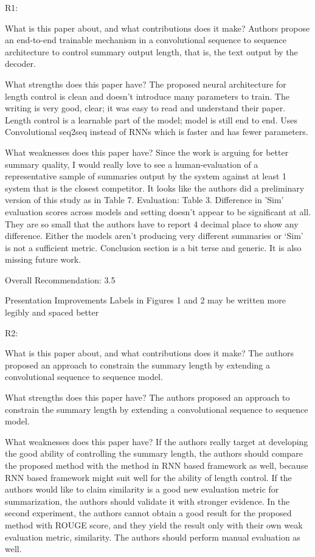 R1:

What is this paper about, and what contributions does it make?
   Authors propose an end-to-end trainable mechanism in a convolutional sequence to sequence architecture to control summary output length, that is, the text output by the decoder.

What strengths does this paper have?
   The proposed neural architecture for length control is clean and doesn’t introduce many parameters to train. The writing is very good, clear; it was easy to read and understand their paper. Length control is a learnable part of the model; model is still end to end. Uses Convolutional seq2seq instead of RNNs which is faster and has fewer parameters.

What weaknesses does this paper have?
   Since the work is arguing for better summary quality, I would really love to see a human-evaluation of a representative sample of summaries output by the system against at least 1 system that is the closest competitor. It looks like the authors did a preliminary version of this study as in Table 7.
   Evaluation: Table 3. Difference in ’Sim’ evaluation scores across models and setting doesn’t appear to be significant at all. They are so small that the authors have to report 4 decimal place to show any difference. Either the models aren’t producing very different summaries or ‘Sim’ is not a sufficient metric.
   Conclusion section is a bit terse and generic. It is also missing future work.

Overall Recommendation:	3.5

Presentation Improvements
  Labels in Figures 1 and 2 may be written more legibly and spaced better

R2:

What is this paper about, and what contributions does it make?
  The authors proposed an approach to constrain the summary length by extending a convolutional sequence to sequence model.

What strengths does this paper have?
  The authors proposed an approach to constrain the summary length by extending a convolutional sequence to sequence model.

What weaknesses does this paper have?
   If the authors really target at developing the good ability of controlling the summary length, the authors should compare the proposed method with the method in RNN based framework as well, because RNN based framework might suit well for the ability of length control.
   If the authors would like to claim similarity is a good new evaluation metric for summarization, the authors should validate it with stronger evidence.
   In the second experiment, the authors cannot obtain a good result for the proposed method with ROUGE score, and they yield the result only with their own weak evaluation metric, similarity.
   The authors should perform manual evaluation as well.

